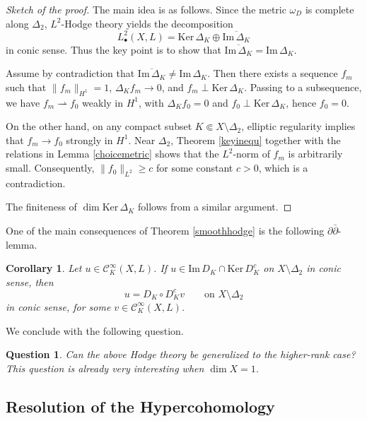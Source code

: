 \documentclass[english]{amsart}
\newcommand{\ddbar}{\partial\bar{\partial}}
\newcommand{\cC}{\mathcal{C}}
\newcommand{\im}{\mathrm{Im} \,}
\renewcommand{\ker}{\mathrm{Ker} \,}
\renewcommand{\geq}{\geqslant}
\newtheorem{quest}[thm]{Question}
\newtheorem{cor}[thm]{Corollary}
\numberwithin{equation}{thm}
\begin{document}
\begin{proof}[Sketch of the proof]
	The main idea is as follows.
	Since the metric $\omega_D$ is complete along $\Delta_2$, $L^2$-Hodge theory \cite{bookJP} yields the decomposition
	\[
	L^2_\bullet(X, L)
	= \ker \Delta_K \oplus \overline{\im \Delta_K}
	\]
	in conic sense.
	Thus the key point is to show that $\overline{\im \Delta_K} = \im \Delta_K$.
	
	Assume by contradiction that $\overline{\im \Delta_K} \neq \im \Delta_K$.
	Then there exists a sequence $f_m$ such that $\|f_m\|_{H^1} = 1$,
	$\Delta_K f_m \to 0$, and $f_m \perp \ker \Delta_K$.
	Passing to a subsequence, we have $f_m \rightharpoonup f_0$ weakly in $H^1$,
	with $\Delta_K f_0 = 0$ and $f_0 \perp \ker \Delta_K$, hence $f_0 = 0$.
	
	On the other hand, on any compact subset $K \Subset X \setminus \Delta_2$,
	elliptic regularity implies that $f_m \to f_0$ strongly in $H^1$.
	Near $\Delta_2$, Theorem \ref{keyinequ} together with the relations in Lemma \ref{choicemetric} shows that
	the $L^2$-norm of $f_m$ is arbitrarily small.
	Consequently, $\|f_0\|_{L^2} \geq c$ for some constant $c > 0$, which is a contradiction.
	
	The finiteness of $\dim \ker \Delta_K$ follows from a similar argument.
\end{proof}

One of the main consequences of Theorem \ref{smoothhodge} is the following $\ddbar$-lemma.

\begin{cor}\label{ddbarK}
	Let $u \in \cC^\infty_K(X, L)$.
	If $u \in \im D_K \cap \ker D_K^c$ on $X \setminus \Delta_2$ in conic sense, then
	\[
	u = D_K \circ D_K^c v \qquad \text{on } X \setminus \Delta_2
	\]
	in conic sense, for some $v \in \cC^\infty_K(X, L)$.
\end{cor}

We conclude with the following question.

\begin{quest}
	Can the above Hodge theory be generalized to the higher-rank case?
	This question is already very interesting when $\dim X = 1$.
\end{quest}


\medskip


\subsection{Resolution of the Hypercohomology}\label{resolutionsection}
\end{document}

